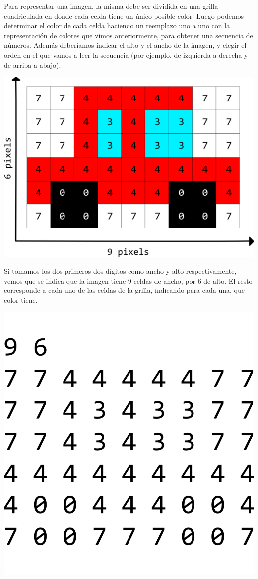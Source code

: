 Para representar una imagen, la misma debe ser dividida en una grilla
cuadriculada en donde cada celda tiene un único posible color. Luego podemos
determinar el color de cada celda haciendo un reemplazo uno a uno con la
representación de colores que vimos anteriormente, para obtener una secuencia de
números. Además deberíamos indicar el alto y el ancho de la imagen, y elegir el
orden en el que vamos a leer la secuencia (por ejemplo, de izquierda a derecha y
de arriba a abajo).

\centerline{\includegraphics[scale=0.75]{unidades/2_informacion/1_bajo_nivel/imagenes/pixels_car_labeled.png}}

Si tomamos los dos primeros dos dígitos como ancho y alto respectivamente, vemos
que se indica que la imagen tiene 9 celdas de ancho, por 6 de alto. El resto
corresponde a cada uno de las celdas de la grilla, indicando para cada una, que
color tiene.

\centerline{\includegraphics[]{unidades/2_informacion/1_bajo_nivel/imagenes/pixels_car_numbers.png}}

